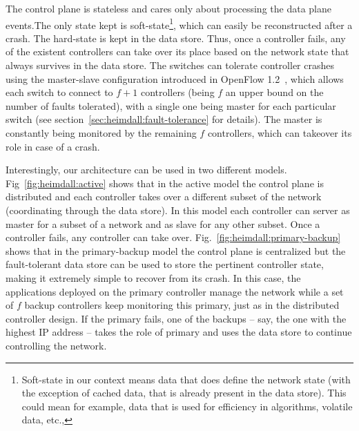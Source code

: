 The control plane is stateless and cares only about processing the data plane events.The only state kept is soft-state\footnote{Soft-state in our context means data that does define the network state (with the exception of cached data, that is already present in the data store). This could mean for example, data that is used for efficiency in algorithms, volatile data, etc.,}, which can easily be reconstructed after a crash. The hard-state is kept in the data store. 
Thus, once a controller fails, any of the existent controllers can take over its place based on the network state that always survives in the data store. 
The switches can tolerate controller crashes using the master-slave configuration introduced in OpenFlow 1.2~\cite{ONF2011}, which allows each switch to connect  to  $f+1$ controllers (being $f$ an upper bound on the number of faults tolerated), with a single one being master for each particular switch (see section~\ref{sec:heimdall:fault-tolerance} for details). 
The master is constantly being monitored by the remaining $f$ controllers, which can takeover its role in case of a crash.

Interestingly, our architecture can be used in two different models.  Fig~\ref{fig:heimdall:active} shows that in the active model the  control plane is distributed and each controller takes over a different subset of the network (coordinating through the data store). In this model each controller can server as master for a subset of a network and as slave for any other subset. Once a controller fails, any controller can take over.  
Fig.~\ref{fig:heimdall:primary-backup} shows that in the primary-backup model  the control plane is centralized but the fault-tolerant data store can be used to store the pertinent controller state, making it extremely simple to recover from its crash.
In this case, the applications deployed on the primary controller manage the network while a set of $f$ backup controllers keep monitoring this primary, just as in the distributed controller design.
If the primary fails, one of the backups -- say, the one with the highest IP address -- takes the role of primary and uses the data store to continue controlling the network.


